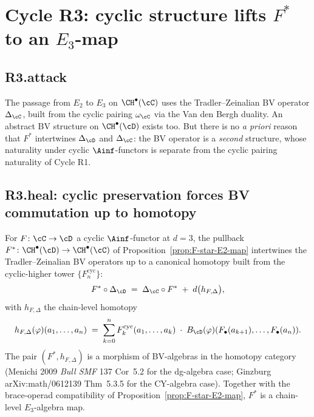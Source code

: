 \section*{Cycle R3: cyclic structure lifts $F^*$ to an $E_3$-map}

\subsection*{R3.attack}

The passage from $E_2$ to $E_3$ on $\CH^\bullet(\cC)$ uses the
Tradler--Zeinalian BV operator $\Delta_\cC$, built from the cyclic
pairing $\omega_\cC$ via the Van den Bergh duality.  An abstract BV
structure on $\CH^\bullet(\cD)$ exists too.  But there is no
\emph{a priori} reason that $F^*$ intertwines $\Delta_\cD$ and
$\Delta_\cC$: the BV operator is a \emph{second} structure, whose
naturality under cyclic $\Ainf$-functors is separate from the cyclic
pairing naturality of Cycle R1.

\subsection*{R3.heal: cyclic preservation forces BV commutation up to homotopy}

\begin{proposition}
\label{prop:F-star-E3-map}
\ClaimStatusProvedHere
For $F \colon \cC \to \cD$ a cyclic $\Ainf$-functor at $d = 3$, the
pullback $F^* \colon \CH^\bullet(\cD) \to \CH^\bullet(\cC)$ of
Proposition~\ref{prop:F-star-E2-map} intertwines the Tradler--Zeinalian
BV operators up to a canonical homotopy built from the cyclic-higher
tower $\{F_n^{\mathrm{cyc}}\}$:
\[
  F^* \circ \Delta_\cD
  \;=\;
  \Delta_\cC \circ F^*
  \;+\; d\bigl(h_{F, \Delta}\bigr),
\]
with $h_{F, \Delta}$ the chain-level homotopy
\[
 h_{F,\Delta}(\varphi)(a_1,\ldots,a_n)
 \;=\;
 \sum_{k=0}^{n}
 F_k^{\mathrm{cyc}}(a_1,\ldots,a_k)
 \;\cdot\;
 B_{\cD}(\varphi)(F_\bullet(a_{k+1}), \ldots, F_\bullet(a_n)).
\]
The pair $(F^*, h_{F,\Delta})$ is a morphism of BV-algebras in the
homotopy category (Menichi 2009 \emph{Bull SMF} 137 Cor~5.2 for the
dg-algebra case; Ginzburg arXiv:math/0612139 Thm~5.3.5 for the CY-algebra
case).  Together with the brace-operad compatibility of
Proposition~\ref{prop:F-star-E2-map}, $F^*$ is a chain-level
$E_3$-algebra map.
\end{proposition}

